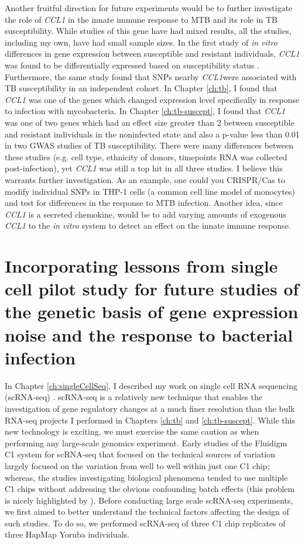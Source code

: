 Another fruitful direction for future experiments would be to further
investigate the role of \emph{CCL1} in the innate immune response to
MTB and its role in TB susceptibility. While studies of this gene have
had mixed results, all the studies, including my own, have had small
sample sizes. In the first study of \emph{in vitro} differences in
gene expression between susceptible and resistant individuals,
\emph{CCL1} was found to be differentially expressed based on
susceptibility status \citep{Thuong2008}. Furthermore, the same study
found that SNPs nearby \emph{CCL1}were associated with TB
susceptibility in an independent cohort. In Chapter \ref{ch:tb}, I
found that \emph{CCL1} was one of the genes which changed expression
level specifically in response to infection with mycobacteria. In
Chapter \ref{ch:tb-suscept}, I found that \emph{CCL1} was one of two
genes which had an effect size greater than 2 between susceptible and
resistant individuals in the noninfected state and also a p-value less
than 0.01 in two GWAS studies of TB susceptibility. There were many
differences between these studies (e.g. cell type, ethnicity of
donors, timepoints RNA was collected post-infection), yet \emph{CCL1}
was still a top hit in all three studies. I believe this warrants
further investigation. As an example, one could you CRISPR/Cas to
modify individual SNPs in THP-1 cells (a common cell line model of
monocytes) and test for differences in the response to MTB
infection. Another idea, since \emph{CCL1} is a secreted chemokine,
would be to add varying amounts of exogenous \emph{CCL1} to the
\emph{in vitro} system to detect an effect on the innate immune
response.

\section{Incorporating lessons from single cell pilot study for future studies of the genetic basis of gene expression noise and the response to bacterial infection}

In Chapter \ref{ch:singleCellSeq}, I described my work on single cell
RNA sequencing (scRNA-seq) \citep{Tung2016}. scRNA-seq is a relatively
new technique that enables the investigation of gene regulatory
changes at a much finer resolution than the bulk RNA-seq projects I
performed in Chapters \ref{ch:tb} and \ref{ch:tb-suscept}. While this
new technology is exciting, we must exercise the same caution as when
performing any large-scale genomics experiment. Early studies of the
Fluidigm C1 system for scRNA-seq that focused on the technical sources
of variation largely focused on the variation from well to well within
just one C1 chip; whereas, the studies investigating biological
phenomena tended to use multiple C1 chips without addressing the
obvious confounding batch effects (this problem is nicely highlighted
by \citep{Hicks2015}). Before conducting large scale scRNA-seq
experiments, we first aimed to better understand the technical factors
affecting the design of such studies. To do so, we performed scRNA-seq
of three C1 chip replicates of three HapMap Yoruba individuals.

